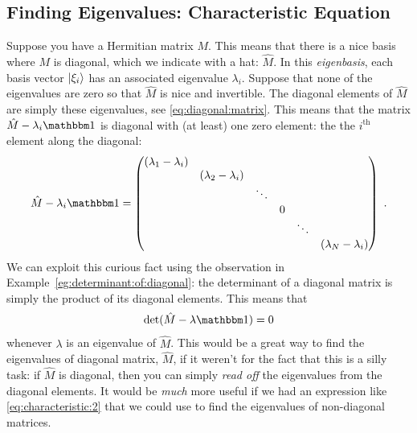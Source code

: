 \documentclass[12pt, oneside]{report}    %
\begin{document}
\subsection{Finding Eigenvalues: Characteristic Equation}

Suppose you have a Hermitian matrix $M$. This means that there is a nice basis where $M$ is diagonal, which we indicate with a hat: $\hat M$. In this \emph{eigenbasis}, each basis vector $\left|\xi_i\right\rangle$ has an associated eigenvalue $\lambda_i$. Suppose that none of the eigenvalues are zero so that $\hat M$ is nice and invertible. The diagonal elements of $\hat M$ are simply these eigenvalues, see \eqref{eq:diagonal:matrix}. This means that the matrix $\hat M - \lambda_i \one$ is diagonal with (at least) one zero element: the the $i^\text{th}$ element along the diagonal:
\begin{align}
\hat M -\lambda_i\one = 
    \begin{pmatrix}
        (\lambda_1 - \lambda_i) & & & && \\
         & (\lambda_2 - \lambda_i) & & && \\
         & & \ddots &&& \\
         & & & 0 & & \\
         & & && \ddots & \\
         & & &&& (\lambda_N-\lambda_i)
    \end{pmatrix} \ .
    \label{eq:characteristic:1}
\end{align} 
We can exploit this curious fact using the observation in Example~\ref{eg:determinant:of:diagonal}: the determinant of a diagonal matrix is simply the product of its diagonal elements. This means that
\begin{align}
     \det(\hat M - \lambda \one) = 0
     \label{eq:characteristic:2}
\end{align}
whenever $\lambda$ is an eigenvalue of $\hat M$. This would be a great way to find the eigenvalues of diagonal matrix, $\hat M$, if it weren't for the fact that this is a silly task: if $\hat M$ is diagonal, then you can simply \emph{read off} the eigenvalues from the diagonal elements. It would be \emph{much} more useful if we had an expression like \eqref{eq:characteristic:2} that we could use to find the eigenvalues of non-diagonal matrices.  
\end{document}
